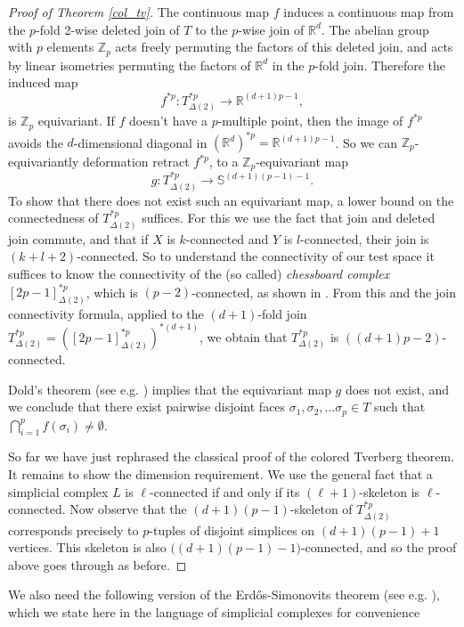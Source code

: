 \documentclass[12pt,a4paper,oneside]{amsart}\sloppy
\theoremstyle{definition}
\begin{document}
 \begin{proof}[Proof of Theorem \ref{col_tv}]
The continuous map $f$ induces a continuous map from the $p$-fold 2-wise deleted join of $T$ to the $p$-wise join of $\mathbb R^d$. The abelian group with $p$ elements $\mathbb Z_p$ acts freely permuting the factors of this deleted join, and acts by linear isometries permuting the factors of $\mathbb R^d$ in the $p$-fold join. Therefore the induced map
$$f^{*p}\colon T^{*p}_{\Delta(2)} \to \mathbb R^{(d+1)p-1},$$
is $\mathbb Z_p$ equivariant. 
If $f$ doesn't have a $p$-multiple point, then the image of $f^{*p}$ avoids the $d$-dimensional diagonal in $(\mathbb {R}^d)^{*p}=\mathbb R^{(d+1)p-1}$. So we can $\mathbb Z_p$-equivariantly deformation retract $f^{*p}$, to a $\mathbb Z_p$-equivariant map $$g\colon T^{*p}_{\Delta(2)} \to \mathbb S^{(d+1)(p-1)-1}.$$
To show that there does not exist such an equivariant map, a lower bound on the connectedness of $T^{*p}_{\Delta(2)}$ suffices. For this we use the fact that join and deleted join commute, and that if $X$ is $k$-connected and $Y$ is $l$-connected, their join is $(k+l+2)$-connected. So to understand the connectivity of our test space it suffices to know the connectivity of the (so called) \emph{chessboard complex} $[2p-1]^{*p}_{\Delta(2)}$, which is $(p-2)$-connected, as shown in \cite{blvz94}. From this and the join connectivity formula, applied to the $(d+1)$-fold join $T^{*p}_{\Delta(2)}=([2p-1]^{*p}_{\Delta(2)})^{*(d+1)}$, we obtain that $T^{*p}_{\Delta(2)}$ is $((d+1)p-2)$-connected. 

Dold's theorem (see e.g. \cite[Theorem 6.2.6]{matousek2003using}) implies that the equivariant map $g$ does not exist, and we conclude that there exist pairwise disjoint faces $\sigma_1,\sigma_2, \ldots \sigma_p \in T$ such that $\bigcap_{i=1}^p f(\sigma_i)\neq \emptyset$. 

So far we have just rephrased the classical proof of the colored Tverberg theorem. It remains to show the dimension requirement. We use the general fact that a simplicial complex $L$ is $\ell$-connected if and only if its $(\ell+1)$-skeleton is $\ell$-connected. Now observe that the $(d+1)(p-1)$-skeleton of $T^{*p}_{\Delta(2)}$ corresponds precisely to $p$-tuples of disjoint simplices on $(d+1)(p-1)+1$ vertices. This skeleton is also $\big( (d+1)(p-1)-1 \big)$-connected, and so the proof above goes through as before.  
 \end{proof}

We also need the following version of the Erd\H{o}s-Simonovits theorem (see e.g. \cite[Theorem 9.2.2]{Matousek2002}), which we state here in the language of simplicial complexes for convenience
\end{document}
